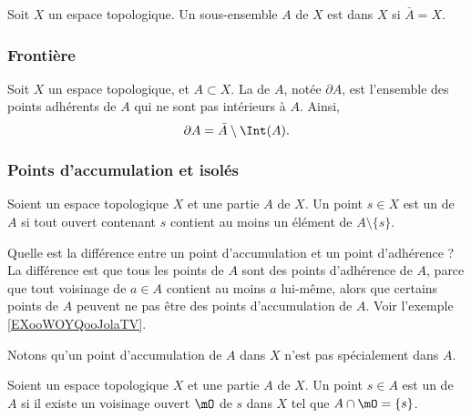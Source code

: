 \begin{definition}\label{DefEnsembleDense}
  Soit \( X \) un espace topologique. Un sous-ensemble \( A \) de \( X \) est  dans \( X \) si \( \bar A = X\). 
\end{definition}

\subsubsection{Frontière}

\begin{definition}
  Soit \( X \) un espace topologique, et \( A \subset X \). La  de \( A \), notée \( \partial A \), est l'ensemble des points adhérents de \( A \) qui ne sont pas intérieurs à \( A \). Ainsi,
  \begin{equation}
    \partial A = \bar A \setminus \Int(A).
  \end{equation}
\end{definition}

\subsubsection{Points d'accumulation et isolés}

\begin{definition}      \label{DEFooGHUUooZKTJRi}
    Soient un espace topologique \( X\) et une partie \( A\) de \( X\). Un point \( s\in X \) est un  de \( A\) si tout ouvert contenant \( s\) contient au moins un élément de \( A\setminus\{ s \}\).
\end{definition}

Quelle est la différence entre un point d'accumulation et un point d'adhérence ? La différence est que tous les points de \( A\) sont des points d'adhérence de \( A\), parce que tout voisinage de \( a\in A\) contient au moins \( a\) lui-même, alors que certains points de \( A\) peuvent ne pas être des points d'accumulation de \( A\). Voir l'exemple \ref{EXooWOYQooJolaTV}.

Notons qu'un point d'accumulation de \( A\) dans \( X\) n'est pas spécialement dans \( A\).

\begin{definition}      \label{DEFooXIOWooWUKJhN}
    Soient un espace topologique \( X\) et une partie \( A\) de \( X\). Un point \( s\in A \) est un  de \( A\) si il existe un voisinage ouvert \( \mO\) de \( s\) dans \( X\) tel que \( A\cap\mO=\{ s \}\).
\end{definition}

